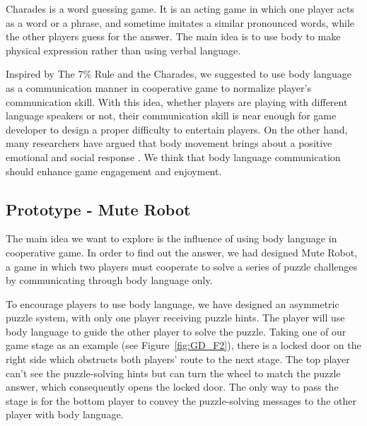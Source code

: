 Charades\cite{GD3} is a word guessing game. It is an acting game in which one player acts as a word or a phrase, and sometime imitates a similar pronounced words, while the other players guess for the answer. The main idea is to use body to make physical expression rather than using verbal language. 


Inspired by The 7\% Rule and the Charades, we suggested to use body language as a communication manner in cooperative game to normalize player's communication skill. With this idea, whether players are playing with different language speakers or not, their communication skill is near enough for game developer to design a proper difficulty to entertain players. On the other hand, many researchers have argued that body movement brings about a positive emotional and social response \cite{GD7, GD8, GD9}. We think that body language communication should enhance game engagement and enjoyment.


\subsection{Prototype - Mute Robot}


The main idea we want to explore is the influence of using body language in cooperative game. In order to find out the answer, we had designed Mute Robot, a game in which two players must cooperate to solve a series of puzzle challenges by communicating through body language only.

To encourage players to use body language, we have designed an asymmetric puzzle system, with only one player receiving puzzle hints. The player will use body language to guide the other player to solve the puzzle. Taking one of our game stage as an example (see Figure~\ref{fig:GD_F2}), there is a locked door on the right side which obstructs both players' route to the next stage. The top player can't see the puzzle-solving hints but can turn the wheel to match the puzzle answer, which consequently opens the locked door. The only way to pass the stage is for the bottom player to convey the puzzle-solving messages to the other player with body language.

